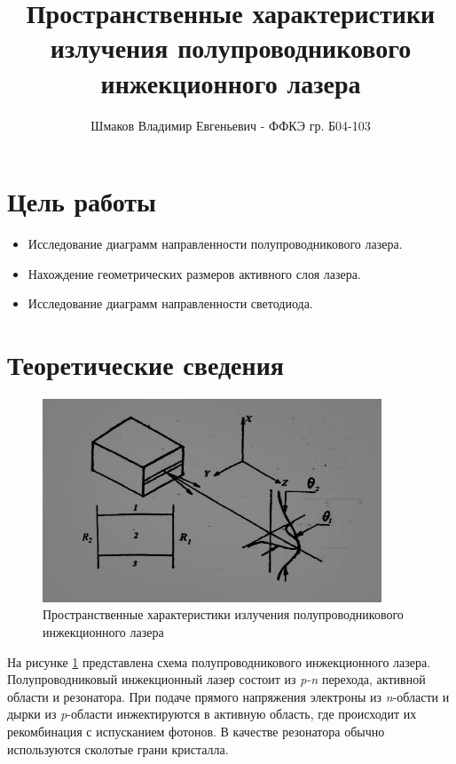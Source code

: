 \documentclass[a4paper, 12pt]{extarticle}
\title{\textcolor{main_title}{Пространственные характеристики излучения полупроводникового инжекционного лазера}}
\author{Шмаков Владимир Евгеньевич - ФФКЭ гр. Б04-103}
\begin{document}
\maketitle



\section*{\textcolor{header}{Цель работы}}

\begin{itemize}
    \item Исследование диаграмм направленности полупроводникового лазера.
    \item Нахождение геометрических размеров активного слоя лазера.
    \item Исследование диаграмм направленности светодиода.
\end{itemize}

\section*{\textcolor{header}{Теоретические сведения}}

\begin{figure}[htbp]
    \centering
    \includegraphics[width = 0.9\textwidth]{pics/setup_1.png}
    \caption{Пространственные характеристики излучения полупроводникового инжекционного лазера}
    \label{fig:1}
\end{figure}

На рисунке \ref{fig:1} представлена схема полупроводникового инжекционного лазера. Полупроводниковый инжекционный лазер состоит из \textit{p-n} перехода, активной области и резонатора. При подаче прямого напряжения электроны из \textit{n}-области и дырки из \textit{p}-области инжектируются в активную область, где происходит их рекомбинация с испусканием фотонов. В качестве резонатора обычно используются сколотые грани кристалла.
\end{document}
